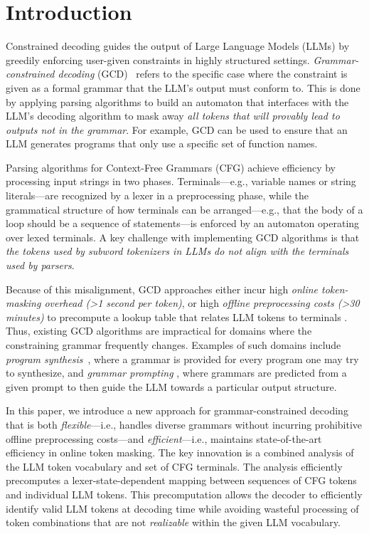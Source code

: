 \section{Introduction}\label{sec:intro}
Constrained decoding guides the output of Large Language Models (LLMs) by greedily enforcing user-given constraints in highly structured settings.
%
\textit{Grammar-constrained decoding} (GCD)~\cite{geng2024grammarconstrained}  refers to the specific case where the constraint is given as a formal grammar that the LLM's output must conform to.
%
This is done by applying parsing algorithms to build an automaton that interfaces with the LLM's decoding algorithm to mask away \textit{all tokens that will provably lead to outputs not in the grammar}.
For example, GCD can be used to ensure that an LLM generates programs that only use a specific set of function names.

Parsing algorithms for Context-Free Grammars (CFG) achieve efficiency by processing input strings in two phases. Terminals---e.g., variable names or string literals---are recognized by a lexer in a preprocessing phase, while the grammatical structure of how terminals can be arranged---e.g., that the body of a loop should be a sequence of statements---is enforced by an automaton operating over lexed terminals.
% 
A key challenge with implementing GCD algorithms is that \textit{the tokens used by subword tokenizers in LLMs do not align with the terminals used by parsers}.

Because of this misalignment, GCD approaches either incur high \textit{online token-masking overhead (>1 second per token)}, or high \textit{offline preprocessing costs (>30 minutes)} to precompute a lookup table that relates LLM tokens to terminals \cite{beurer2024domino, ugare2024syncode}. Thus, existing GCD algorithms are impractical for domains where the constraining grammar frequently changes.
% 
Examples of such domains include \textit{program synthesis}~\cite{alur2019syguscomp}, where a grammar is provided for every program one may try to synthesize, and \textit{grammar prompting} \cite{wang2024grammar}, where  grammars are predicted from a given prompt to then guide the LLM towards a particular output structure. 

In this paper, we introduce a new approach for grammar-constrained decoding that is both \emph{flexible}---i.e., handles diverse grammars without incurring prohibitive offline preprocessing costs---and \emph{efficient}---i.e., maintains state-of-the-art efficiency in online token masking.
%
The key innovation is a combined analysis of the LLM token vocabulary and set of CFG terminals. 
% 
The analysis efficiently precomputes a lexer-state-dependent mapping between sequences of CFG tokens and individual LLM tokens. 
This precomputation allows the decoder to efficiently identify valid LLM tokens at decoding time while avoiding wasteful processing of token combinations that are not \emph{realizable} within the given LLM vocabulary.


